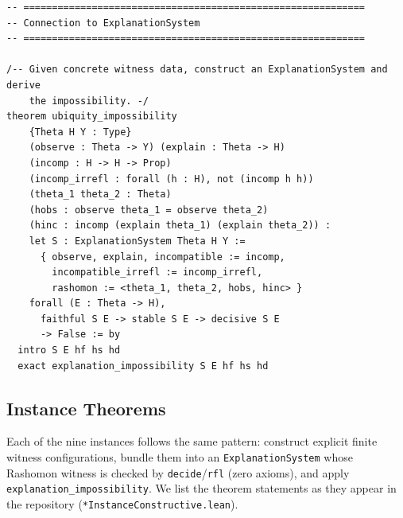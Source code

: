 \documentclass[11pt,a4paper]{article}
\begin{document}
\begin{lstlisting}[caption={Ubiquity.lean --- complete file},label={lst:ubiquity}]
-- ============================================================
-- Connection to ExplanationSystem
-- ============================================================

/-- Given concrete witness data, construct an ExplanationSystem and derive
    the impossibility. -/
theorem ubiquity_impossibility
    {Theta H Y : Type}
    (observe : Theta -> Y) (explain : Theta -> H)
    (incomp : H -> H -> Prop)
    (incomp_irrefl : forall (h : H), not (incomp h h))
    (theta_1 theta_2 : Theta)
    (hobs : observe theta_1 = observe theta_2)
    (hinc : incomp (explain theta_1) (explain theta_2)) :
    let S : ExplanationSystem Theta H Y :=
      { observe, explain, incompatible := incomp,
        incompatible_irrefl := incomp_irrefl,
        rashomon := <theta_1, theta_2, hobs, hinc> }
    forall (E : Theta -> H),
      faithful S E -> stable S E -> decisive S E
      -> False := by
  intro S E hf hs hd
  exact explanation_impossibility S E hf hs hd
\end{lstlisting}

\subsection{Instance Theorems}
\label{app:lean-instances}

Each of the nine instances follows the same pattern: construct explicit
finite witness configurations, bundle them into an
\texttt{ExplanationSystem} whose Rashomon witness is checked by
\texttt{decide}/\texttt{rfl} (zero axioms), and apply
\texttt{explanation\_impossibility}.  We list the theorem statements as
they appear in the repository (\texttt{*InstanceConstructive.lean}).
\end{document}
